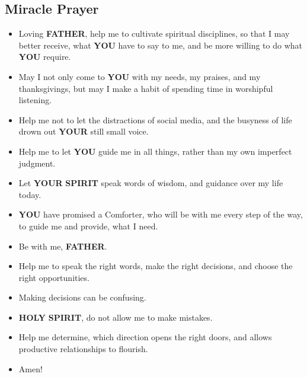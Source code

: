 \documentclass[10pt,a5paper]{article}
\newcommand{\Father}[0]{\textbf{FATHER}}
\newcommand{\Holy}[0]{\textbf{HOLY}}
\newcommand{\Spirit}[0]{\textbf{SPIRIT}}
\newcommand{\You}[0]{\textbf{YOU}}
\newcommand{\Your}[0]{\textbf{YOUR}}
\begin{document}
	\subsection{Miracle Prayer}
		\begin{itemize}[nosep]
			\item	Loving {\Father},
					help me to cultivate spiritual disciplines,
					so that I may better receive,
					what {\You} have to say to me,
					and be more willing to do what {\You} require.
			\item	May I not only come to {\You} with my needs,
					my praises,
					and my thanksgivings,
					but may I make a habit of spending time in worshipful listening.
			\item	Help me not to let the distractions of social media,
					and the busyness of life drown out {\Your} still small voice.
			\item	Help me to let {\You} guide me in all things,
					rather than my own imperfect judgment.
			\item	Let {\Your} {\Spirit} speak words of wisdom,
					and guidance over my life today.
			\item	{\You} have promised a Comforter,
					who will be with me every step of the way,
					to guide me and provide,
					what I need.
			\item	Be with me,
					{\Father}.
			\item	Help me to speak the right words,
					make the right decisions,
					and choose the right opportunities.
			\item	Making decisions can be confusing.
			\item	{\Holy} {\Spirit},
					do not allow me to make mistakes.
			\item	Help me determine,
					which direction opens the right doors,
					and allows productive relationships to flourish.
			\item	Amen!
		\end{itemize}
		
\end{document}
